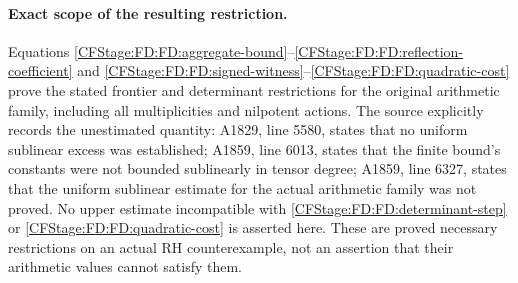 \paragraph{Exact scope of the resulting restriction.}
Equations \eqref{CFStage:FD:FD:aggregate-bound}--\eqref{CFStage:FD:FD:reflection-coefficient}
and \eqref{CFStage:FD:FD:signed-witness}--\eqref{CFStage:FD:FD:quadratic-cost} prove the stated
frontier and determinant restrictions for the original arithmetic
family, including all multiplicities and nilpotent actions.  The source
explicitly records the unestimated quantity: A1829, line 5580, states
that no uniform sublinear excess was established; A1859, line 6013,
states that the finite bound's constants were not bounded sublinearly in
tensor degree; A1859, line 6327, states that the uniform sublinear
estimate for the actual arithmetic family was not proved.  No upper
estimate incompatible with \eqref{CFStage:FD:FD:determinant-step} or
\eqref{CFStage:FD:FD:quadratic-cost} is asserted here.  These are proved necessary
restrictions on an actual RH counterexample, not an assertion that their
arithmetic values cannot satisfy them.

